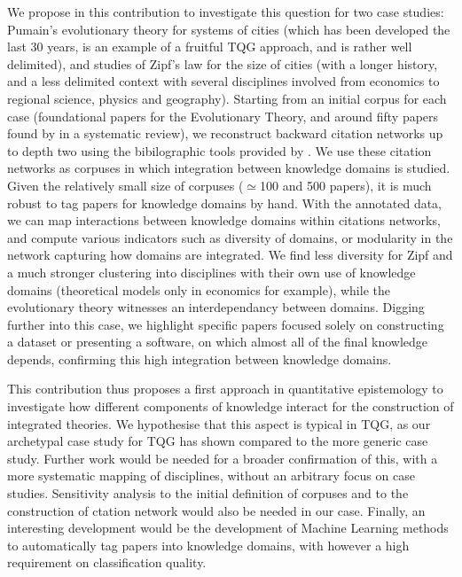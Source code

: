 \documentclass[11pt]{article}
\begin{document}
We propose in this contribution to investigate this question for two case studies: Pumain's evolutionary theory for systems of cities \cite{pumain2018evolutionary} (which has been developed the last 30 years, is an example of a fruitful TQG approach, and is rather well delimited), and studies of Zipf's law for the size of cities \cite{cottineau2017metazipf} (with a longer history, and a less delimited context with several disciplines involved from economics to regional science, physics and geography). Starting from an initial corpus for each case (foundational papers for the Evolutionary Theory, and around fifty papers found by \cite{cottineau2017metazipf} in a systematic review), we reconstruct backward citation networks up to depth two using the bibilographic tools provided by \cite{raimbault2019exploration}. We use these citation networks as corpuses in which integration between knowledge domains is studied. Given the relatively small size of corpuses ($\simeq$100 and 500 papers), it is much robust to tag papers for knowledge domains by hand. With the annotated data, we can map interactions between knowledge domains within citations networks, and compute various indicators such as diversity of domains, or modularity in the network capturing how domains are integrated. We find less diversity for Zipf and a much stronger clustering into disciplines with their own use of knowledge domains (theoretical models only in economics for example), while the evolutionary theory witnesses an interdependancy between domains. Digging further into this case, we highlight specific papers focused solely on constructing a dataset or presenting a software, on which almost all of the final knowledge depends, confirming this high integration between knowledge domains.


This contribution thus proposes a first approach in quantitative epistemology to investigate how different components of knowledge interact for the construction of integrated theories. We hypothesise that this aspect is typical in TQG, as our archetypal case study for TQG has shown compared to the more generic case study. Further work would be needed for a broader confirmation of this, with a more systematic mapping of disciplines, without an arbitrary focus on case studies. Sensitivity analysis to the initial definition of corpuses and to the construction of ctation network would also be needed in our case. Finally, an interesting development would be the development of Machine Learning methods to automatically tag papers into knowledge domains, with however a high requirement on classification quality.


{\small


}
\end{document}
